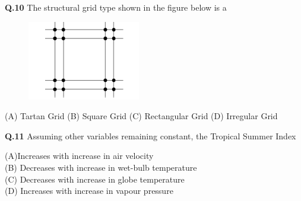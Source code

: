 \documentclass{article}
\begin{document}
\vspace{0.5cm}

\noindent \textbf{Q.10} \hspace{0.5cm} The structural grid type shown in the figure below is a

\vspace{0.2cm}
\begin{figure}[h!]
    \centering
    \includegraphics[width=0.25\linewidth]{Figs/10.png}
 
\end{figure}



\begin{center}
\hspace{1cm}
(A) Tartan Grid \hspace{1cm} (B) Square Grid \hspace{1cm} (C) Rectangular Grid \hspace{1cm} (D) Irregular Grid
\end{center}

\vspace{0.4cm}

\noindent \textbf{Q.11} \hspace{0.5cm} Assuming other variables remaining constant, the Tropical Summer Index
\vspace{0.05cm}


\begin{flushleft}
  \hspace{1.4cm} (A)Increases with increase in air velocity \\
  \hspace{1.5cm}(B) Decreases with increase in wet-bulb temperature \\
  \hspace{1.5cm}(C) Decreases with increase in globe temperature \\
  \hspace{1.5cm}(D) Increases with increase in vapour pressure
\end{flushleft}

\vspace{0.15cm}
\end{document}

